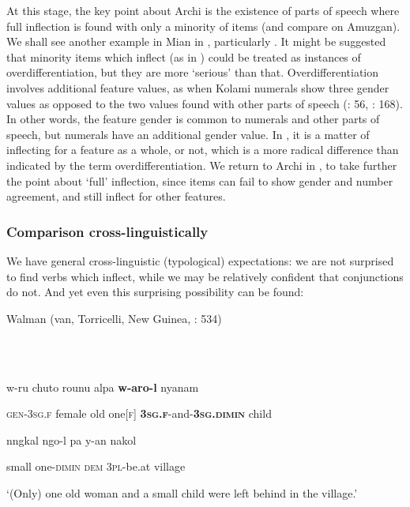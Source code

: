 \documentclass[output=paper]{langscibook}
\begin{document}
At this stage, the key point about Archi is the existence of parts of speech where full inflection is found with only a minority of items (and compare \citealt{Palancar2025} on Amuzgan). We shall see another example in Mian in , particularly . It might be suggested that minority items which inflect (as in ) could be treated as instances of overdifferentiation, but they are more ‘serious’ than that. Overdifferentiation involves additional feature values, as when Kolami numerals show three gender values as opposed to the two values found with other parts of speech (\citealt{Emeneau1955}: 56, \citealt{Corbett1991}: 168). In other words, the feature gender is common to numerals and other parts of speech, but numerals have an additional gender value. In , it is a matter of inflecting for a feature as a whole, or not, which is a more radical difference than indicated by the term overdifferentiation. We return to Archi in , to take further the point about ‘full’ inflection, since items can fail to show gender and number agreement, and still inflect for other features. 

\subsubsection{\textbf{Comparison} \textbf{cross-linguistically} }

We have general cross-linguistic (typological) expectations: we are not surprised to find verbs which inflect, while we may be relatively confident that conjunctions do not. And yet even this surprising possibility can be found:

Walman (van, Torricelli, New Guinea, \citealt{BrownDryer2008}: 534)

\ea%
    \label{ex:key:6}
    \gll \\
         \\
    \glt
    \z %

          w-ru  chuto  rounu  alpa  \textbf{w-aro-l}  nyanam

  \textsc{gen-3sg.f}  female  old  one[\textsc{f}]  \textbf{\textsc{3sg.f}}\textsc{{}-}and\textsc{{}-}\textbf{\textsc{3sg.dimin}}  child

  nngkal  ngo-l  pa  y-an  nakol

  small  one-\textsc{dimin}  \textsc{dem}  \textsc{3pl}{}-be.at  village

  ‘(Only) one old woman and a small child were left behind in the village.’
\end{document}
